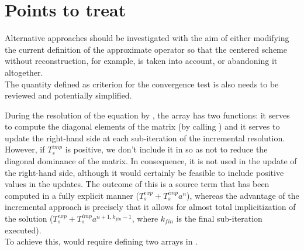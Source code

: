 \section*{Points to treat}\label{Base_Codits_section4}
Alternative approaches should be investigated with the aim of either modifying the current definition
of the approximate operator so that the centered scheme without reconstruction, for example, is
taken into account, or abandoning it altogether.\\

The quantity defined as criterion for the convergence test is also needs to be reviewed and potentially simplified.

During the resolution of the equation by , the  array has
two functions: it serves to compute the diagonal elements of the matrix (by calling
) and it serves to update the right-hand side at each
sub-iteration of the incremental resolution. However, if $T_s^{imp}$ is positive,
we don't include it in  so as not to reduce the diagonal dominance
of the matrix. In consequence, it is not used in the update of the right-hand side,
although it would certainly be feasible to include positive values in the updates.
The outcome of this is a source term that has been computed in a fully explicit
manner ($T_s^{exp}+T_s^{imp}a^n$), whereas the advantage of the incremental
approach is precisely that it allows for almost total implicitization of the solution
($T_s^{exp}+T_s^{imp}a^{n+1,k_{fin}-1}$, where $k_{fin}$ is
the final sub-iteration executed).\\
To achieve this, would require defining two  arrays in .
